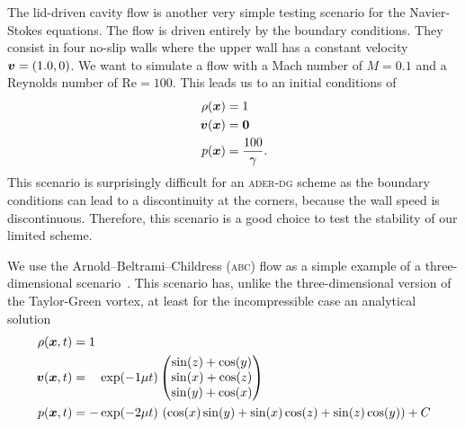 The lid-driven cavity flow is another very simple testing scenario for the Navier-Stokes equations.
The flow is driven entirely by the boundary conditions.
They consist in four no-slip walls where the upper wall has a constant velocity $\bm{v} = (1.0, 0)$.
We want to simulate a flow with a Mach number of $M = 0.1$ and a Reynolds number of $\text{Re} = 100$.
This leads us to an initial conditions of
\begin{align}
  \label{eq:taylor-green}
  \begin{split}
  \rho(\bm{x}) &= 1\\
  \bm{v}(\bm{x}) &=  \bm{0}\\
  p(\bm{x}) &= \frac{100}{\gamma}.
  \end{split}
\end{align}
This scenario is surprisingly difficult for an \textsc{ader-dg} scheme as the boundary conditions can lead to a discontinuity at the corners, because the wall speed is discontinuous.
Therefore, this scenario is a good choice to test the stability of our limited scheme.

We use the Arnold–Beltrami–Childress (\textsc{abc}) flow as a simple example of a three-dimensional scenario~\cite{tavelli2016staggered}.
This scenario has, unlike the three-dimensional version of the Taylor-Green vortex, at least for the incompressible case an analytical solution
\begin{align}
  \label{eq:abc-flow}
  \begin{split}
  \rho(\bm{x}, t) &= 1\\
  \bm{v}(\bm{x}, t) &= \phantom{-} \exp(-1\mu t)
  \begin{pmatrix}
    \sin(z) + \cos(y)\\
    \sin(x) + \cos(z)\\
    \sin(y) + \cos(x)
  \end{pmatrix} \\
  p(\bm{x}, t) &= -\exp(-2 \mu t) \, \left(\cos(x)\sin(y) + \sin(x)\cos(z) + \sin(z)\cos(y)\right)
  + C
  \end{split}
\end{align}

